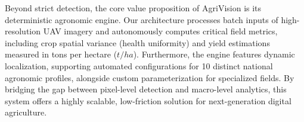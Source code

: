 Beyond strict detection, the core value proposition of AgriVision is its deterministic agronomic engine. Our architecture processes batch inputs of high-resolution UAV imagery and autonomously computes critical field metrics, including crop spatial variance (health uniformity) and yield estimations measured in tons per hectare ($t/ha$). Furthermore, the engine features dynamic localization, supporting automated configurations for 10 distinct national agronomic profiles, alongside custom parameterization for specialized fields. By bridging the gap between pixel-level detection and macro-level analytics, this system offers a highly scalable, low-friction solution for next-generation digital agriculture.
